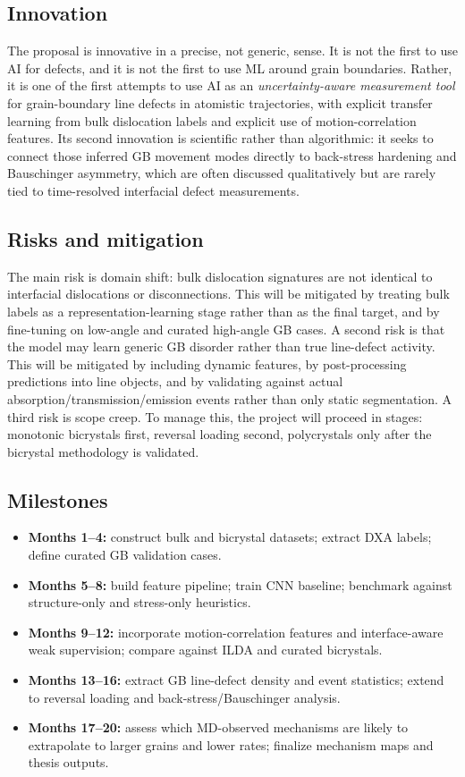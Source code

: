 \subsection*{Innovation}
The proposal is innovative in a precise, not generic, sense. It is not the first to use AI for defects, and it is not the first to use ML around grain boundaries. Rather, it is one of the first attempts to use AI as an \emph{uncertainty-aware measurement tool} for grain-boundary line defects in atomistic trajectories, with explicit transfer learning from bulk dislocation labels and explicit use of motion-correlation features. Its second innovation is scientific rather than algorithmic: it seeks to connect those inferred GB movement modes directly to back-stress hardening and Bauschinger asymmetry, which are often discussed qualitatively but are rarely tied to time-resolved interfacial defect measurements.

\subsection*{Risks and mitigation}
The main risk is domain shift: bulk dislocation signatures are not identical to interfacial dislocations or disconnections. This will be mitigated by treating bulk labels as a representation-learning stage rather than as the final target, and by fine-tuning on low-angle and curated high-angle GB cases. A second risk is that the model may learn generic GB disorder rather than true line-defect activity. This will be mitigated by including dynamic features, by post-processing predictions into line objects, and by validating against actual absorption/transmission/emission events rather than only static segmentation. A third risk is scope creep. To manage this, the project will proceed in stages: monotonic bicrystals first, reversal loading second, polycrystals only after the bicrystal methodology is validated.

\subsection*{Milestones}
\begin{itemize}
    \item \textbf{Months 1--4:} construct bulk and bicrystal datasets; extract DXA labels; define curated GB validation cases.
    \item \textbf{Months 5--8:} build feature pipeline; train CNN baseline; benchmark against structure-only and stress-only heuristics.
    \item \textbf{Months 9--12:} incorporate motion-correlation features and interface-aware weak supervision; compare against ILDA and curated bicrystals.
    \item \textbf{Months 13--16:} extract GB line-defect density and event statistics; extend to reversal loading and back-stress/Bauschinger analysis.
    \item \textbf{Months 17--20:} assess which MD-observed mechanisms are likely to extrapolate to larger grains and lower rates; finalize mechanism maps and thesis outputs.
\end{itemize}

